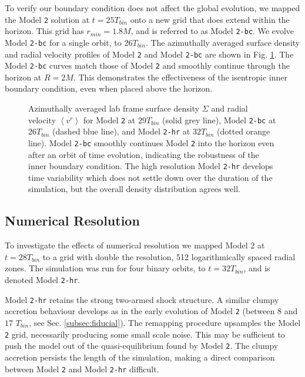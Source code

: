 \documentclass{emulateapj}
\newcommand{\model}[1]{{Model \texttt{#1}}}
\newcommand{\ave}[1]{\left \langle #1 \right \rangle}
\begin{document}
To verify our boundary condition does not affect the global evolution, we mapped the \model{2} solution at $t=25 T_{bin}$ onto a new grid that does extend within the horizon.  This grid has $r_{min} = 1.8M$, and is referred to as \model{2-bc}.  We evolve \model{2-bc} for a single orbit, to $26T_{bin}$.  The azimuthally averaged surface density and radial velocity profiles of \model{2} and \model{2-bc} are shown in Fig. \ref{fi:bc_hr_comp}.  The \model{2-bc} curves match those of \model{2} and smoothly continue through the horizon at $R=2M$.  This demonstrates the effectiveness of the isentropic inner boundary condition, even when placed above the horizon.

\begin{figure}
	\caption{\label{fi:bc_hr_comp} Azimuthally averaged lab frame surface density $\Sigma$ and radial velocity $\ave{v^r}$ for \model{2} at $29T_{bin}$ (solid grey line), \model{2-bc} at $26T_{bin}$ (dashed blue line), and \model{2-hr}  at $32T_{bin}$ (dotted orange line). \model{2-bc} smoothly continues \model{2} into the horizon even after an orbit of time evolution, indicating the robustness of the inner boundary condition.  The high resolution \model{2-hr} develops time variability which does not settle down over the duration of the simulation, but the overall density distribution agrees well.}
\end{figure}

\subsection{Numerical Resolution}
\label{subsec:res}

To investigate the effects of numerical resolution we mapped Model 2 at $t=28T_{bin}$ to a grid with double the resolution, 512 logarithmically spaced radial zones.  The simulation was run for four binary orbits, to $t = 32 T_{bin}$, and is denoted Model \texttt{2-hr}.

Model \texttt{2-hr} retains the strong two-armed shock structure. A similar clumpy accretion behaviour develops as in the early evolution of \model{2} (between $8$ and $17$ $T_{bin}$, see Sec. \ref{subsec:fiducial}).  The remapping procedure upsamples the \model{2} grid, necessarily producing some small scale noise.  This may be sufficient to push the model out of the quasi-equilibrium found by \model{2}. The clumpy accretion persists the length of the simulation, making a direct comparison between \model{2} and \model{2-hr} difficult.
\end{document}
